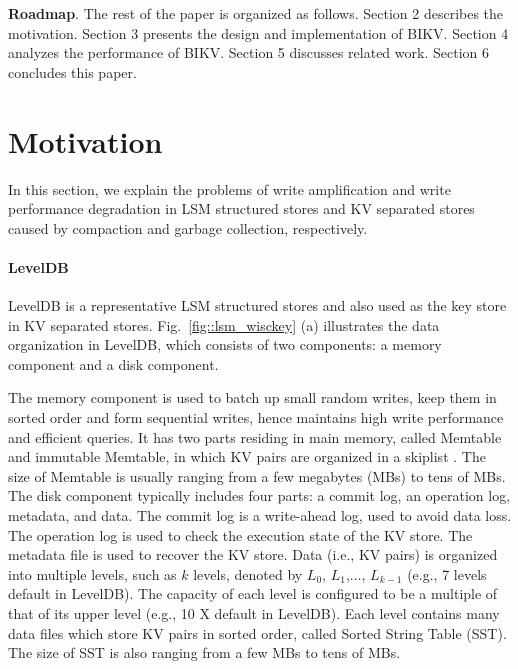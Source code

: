 \documentclass[sigconf]{acmart}
\begin{document}
\textbf{Roadmap}. The rest of the paper is organized as follows. Section 2 describes the motivation. Section 3 presents the design and implementation of BIKV. Section 4 analyzes the performance of BIKV. Section 5 discusses related work. Section 6 concludes this paper.

\section{Motivation}
In this section, we explain the problems of write amplification and write performance degradation in LSM structured stores and KV separated stores caused by compaction and garbage collection, respectively.

\paragraph{LevelDB} LevelDB \cite{LevelDB} is a representative LSM structured stores and also used as the key store in KV separated stores. Fig.~\ref{fig::lsm_wisckey} (a) illustrates the data organization in LevelDB, which consists of two components: a memory component and a disk component. 

The memory component is used to batch up small random writes, keep them in sorted order and form sequential writes, hence maintains high write performance and efficient queries. It has two parts residing in main memory, called Memtable and immutable Memtable, in which KV pairs are organized in a skiplist \cite{skiplist}. The size of Memtable is usually ranging from a few megabytes (MBs) to tens of MBs. The disk component typically includes four parts: a commit log, an operation log, metadata, and data. The commit log is a write-ahead log, used to avoid data loss. The operation log is used to check the execution state of the KV store. The metadata file is used to recover the KV store. Data (i.e., KV pairs) is organized into multiple levels, such as $k$ levels, denoted by $L_0$, $L_1$,$\ldots$, $L_{k-1}$ (e.g., 7 levels default in LevelDB). The capacity of each level is configured to be a multiple of that of its upper level (e.g., 10 X default in LevelDB). Each level contains many data files which store KV pairs in sorted order, called Sorted String Table (SST). The size of SST is also ranging from a few MBs to tens of MBs.
\end{document}

